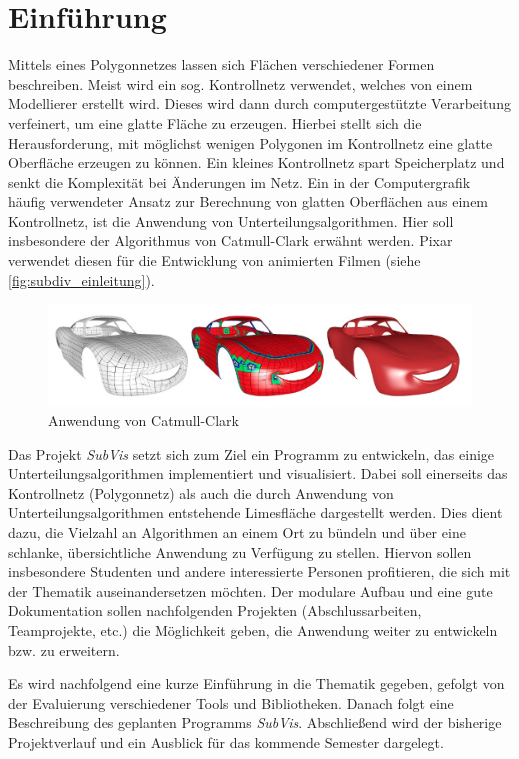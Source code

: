 \chapter{Einführung}

Mittels eines Polygonnetzes lassen sich Flächen verschiedener Formen beschreiben. 
Meist wird ein sog. Kontrollnetz verwendet, welches von einem Modellierer erstellt wird.
Dieses wird dann durch computergestützte Verarbeitung verfeinert, um eine glatte Fläche zu erzeugen.
Hierbei stellt sich die Herausforderung, mit möglichst wenigen Polygonen im Kontrollnetz eine glatte Oberfläche erzeugen zu können.
Ein kleines Kontrollnetz spart Speicherplatz und senkt die Komplexität bei Änderungen im Netz.
Ein in der Computergrafik häufig verwendeter Ansatz zur Berechnung von glatten Oberflächen aus einem Kontrollnetz, ist die Anwendung von Unterteilungsalgorithmen.
Hier soll insbesondere der Algorithmus von Catmull-Clark erwähnt werden.
Pixar verwendet diesen für die Entwicklung von animierten Filmen (siehe \autoref{fig:subdiv_einleitung}).

\begin{figure}
  \centering
  \includegraphics[width=\textwidth]{content/media/sd_einleitung.jpg}
  \caption{Anwendung von Catmull-Clark \cite{niessner2012feature}}
  \label{fig:subdiv_einleitung}
\end{figure}


Das Projekt \emph{SubVis} setzt sich zum Ziel ein Programm zu entwickeln, das einige Unterteilungsalgorithmen implementiert und visualisiert. 
Dabei soll einerseits das Kontrollnetz (Polygonnetz) als auch die durch Anwendung von Unterteilungsalgorithmen entstehende Limesfläche dargestellt werden.
Dies dient dazu, die Vielzahl an Algorithmen an einem Ort zu bündeln und über eine schlanke, übersichtliche Anwendung zu Verfügung zu stellen.
Hiervon sollen insbesondere Studenten und andere interessierte Personen profitieren, die sich mit der Thematik auseinandersetzen möchten.
Der modulare Aufbau und eine gute Dokumentation sollen nachfolgenden Projekten (Abschlussarbeiten, Teamprojekte, etc.) die Möglichkeit geben, die Anwendung weiter zu entwickeln bzw. zu erweitern.

Es wird nachfolgend eine kurze Einführung in die Thematik gegeben, gefolgt von der Evaluierung verschiedener Tools und Bibliotheken. 
Danach folgt eine Beschreibung des geplanten Programms \emph{SubVis}.
Abschließend wird der bisherige Projektverlauf und ein Ausblick für das kommende Semester dargelegt.